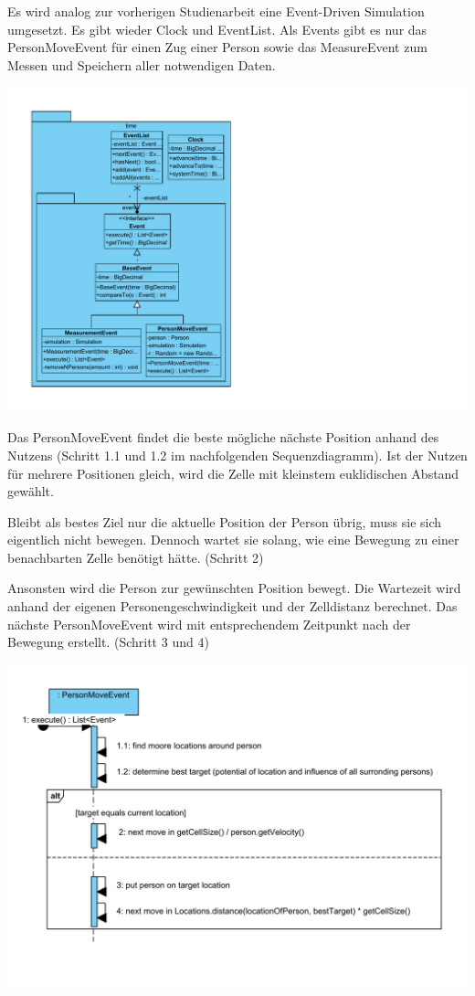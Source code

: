 Es wird analog zur vorherigen Studienarbeit eine Event-Driven Simulation umgesetzt. Es gibt wieder Clock und EventList. Als Events gibt es nur das
PersonMoveEvent für einen Zug einer Person sowie das MeasureEvent zum Messen und Speichern aller notwendigen Daten.

\includegraphics[width=\textwidth]{abbildungen/uml/time}

Das PersonMoveEvent findet die beste mögliche nächste Position anhand des Nutzens (Schritt 1.1 und 1.2 im nachfolgenden Sequenzdiagramm). Ist der Nutzen für mehrere Positionen gleich, wird die Zelle mit kleinstem euklidischen Abstand gewählt.

Bleibt als bestes Ziel nur die aktuelle Position der Person übrig, muss sie sich eigentlich nicht bewegen. Dennoch wartet sie solang, wie eine Bewegung zu einer benachbarten Zelle benötigt hätte. (Schritt 2)

Ansonsten wird die Person zur gewünschten Position bewegt. Die Wartezeit wird anhand der eigenen Personengeschwindigkeit und der Zelldistanz berechnet. Das nächste PersonMoveEvent wird mit entsprechendem Zeitpunkt nach der Bewegung erstellt. (Schritt 3 und 4)

\includegraphics[width=\textwidth]{abbildungen/uml/moveevent-execute}


